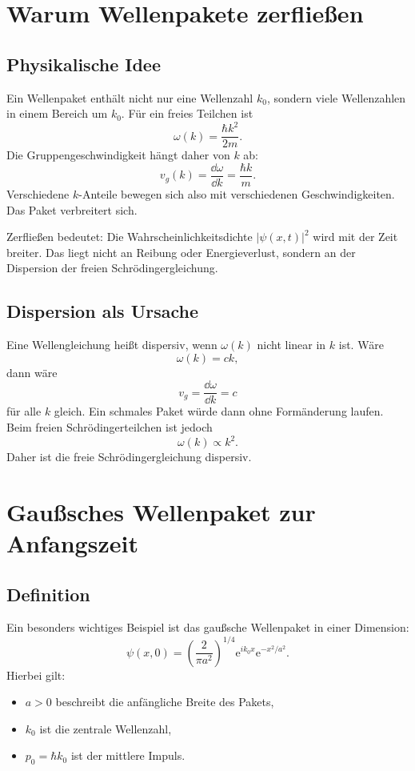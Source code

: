 \section{Warum Wellenpakete zerfließen}

\subsection{Physikalische Idee}

Ein Wellenpaket enthält nicht nur eine Wellenzahl $k_0$, sondern viele Wellenzahlen in einem Bereich um $k_0$. Für ein freies Teilchen ist
\[
    \omega(k)=\frac{\hbar k^2}{2m}.
\]
Die Gruppengeschwindigkeit hängt daher von $k$ ab:
\[
    v_g(k)=\frac{\dd\omega}{\dd k}=\frac{\hbar k}{m}.
\]
Verschiedene $k$-Anteile bewegen sich also mit verschiedenen Geschwindigkeiten. Das Paket verbreitert sich.

\begin{conceptbox}
Zerfließen bedeutet: Die Wahrscheinlichkeitsdichte $|\psi(x,t)|^2$ wird mit der Zeit breiter. Das liegt nicht an Reibung oder Energieverlust, sondern an der Dispersion der freien Schrödingergleichung.
\end{conceptbox}

\subsection{Dispersion als Ursache}

Eine Wellengleichung heißt dispersiv, wenn $\omega(k)$ nicht linear in $k$ ist. Wäre
\[
    \omega(k)=ck,
\]
dann wäre
\[
    v_g=\frac{\dd\omega}{\dd k}=c
\]
für alle $k$ gleich. Ein schmales Paket würde dann ohne Formänderung laufen. Beim freien Schrödingerteilchen ist jedoch
\[
    \omega(k)\propto k^2.
\]
Daher ist die freie Schrödingergleichung dispersiv.

\section{Gaußsches Wellenpaket zur Anfangszeit}

\subsection{Definition}

Ein besonders wichtiges Beispiel ist das gaußsche Wellenpaket in einer Dimension:
\[
    \psi(x,0)=\left(\frac{2}{\pi a^2}\right)^{1/4}
    \mathrm{e}^{ik_0x}\mathrm{e}^{-x^2/a^2}.
\]
Hierbei gilt:
\begin{itemize}
    \item $a>0$ beschreibt die anfängliche Breite des Pakets,
    \item $k_0$ ist die zentrale Wellenzahl,
    \item $p_0=\hbar k_0$ ist der mittlere Impuls.
\end{itemize}

